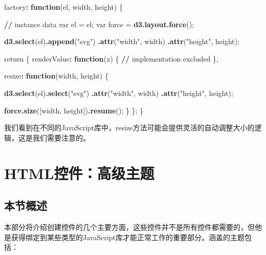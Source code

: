 \documentclass[]{book}
\newenvironment{Shaded}{\begin{snugshade}}{\end{snugshade}}
\newcommand{\KeywordTok}[1]{\textcolor[rgb]{0.13,0.29,0.53}{\textbf{#1}}}
\newcommand{\StringTok}[1]{\textcolor[rgb]{0.31,0.60,0.02}{#1}}
\newcommand{\ControlFlowTok}[1]{\textcolor[rgb]{0.13,0.29,0.53}{\textbf{#1}}}
\newcommand{\OperatorTok}[1]{\textcolor[rgb]{0.81,0.36,0.00}{\textbf{#1}}}
\newcommand{\ErrorTok}[1]{\textcolor[rgb]{0.64,0.00,0.00}{\textbf{#1}}}
\newcommand{\NormalTok}[1]{#1}
\theoremstyle{definition}
\theoremstyle{definition}
\theoremstyle{definition}
\theoremstyle{remark}
\begin{document}
\begin{Shaded}
\begin{Highlighting}[]
\NormalTok{factory}\OperatorTok{:}\StringTok{ }\ControlFlowTok{function}\NormalTok{(el, width, height) \{}

  \OperatorTok{/}\ErrorTok{/}\StringTok{ }\NormalTok{instance data}
\NormalTok{  var el =}\StringTok{ }\NormalTok{el;}
\NormalTok{  var force =}\StringTok{ }\KeywordTok{d3.layout.force}\NormalTok{();}

  \KeywordTok{d3.select}\NormalTok{(el)}\KeywordTok{.append}\NormalTok{(}\StringTok{"svg"}\NormalTok{)}
    \KeywordTok{.attr}\NormalTok{(}\StringTok{"width"}\NormalTok{, width)}
    \KeywordTok{.attr}\NormalTok{(}\StringTok{"height"}\NormalTok{, height);}
      
\NormalTok{  return \{}
\NormalTok{    renderValue}\OperatorTok{:}\StringTok{ }\ControlFlowTok{function}\NormalTok{(x) \{}
      \OperatorTok{/}\ErrorTok{/}\StringTok{ }\NormalTok{implementation excluded}
\NormalTok{    \},}
      
\NormalTok{    resize}\OperatorTok{:}\StringTok{ }\ControlFlowTok{function}\NormalTok{(width, height) \{}
         
      \KeywordTok{d3.select}\NormalTok{(el)}\KeywordTok{.select}\NormalTok{(}\StringTok{"svg"}\NormalTok{)}
        \KeywordTok{.attr}\NormalTok{(}\StringTok{"width"}\NormalTok{, width)}
        \KeywordTok{.attr}\NormalTok{(}\StringTok{"height"}\NormalTok{, height);}

      \KeywordTok{force.size}\NormalTok{([width, height])}\KeywordTok{.resume}\NormalTok{();}
\NormalTok{    \}}
\NormalTok{  \};}
\NormalTok{\}}
\end{Highlighting}
\end{Shaded}

我们看到在不同的JavaScript库中，resize方法可能会提供灵活的自动调整大小的逻辑，这是我们需要注意的。

\chapter{HTML控件：高级主题}\label{htmlwidgets-advanced}

\section{本节概述}

本部分将介绍创建控件的几个主要方面，这些控件并不是所有控件都需要的，但他是获得绑定到某些类型的JavaScript库才能正常工作的重要部分。涵盖的主题包括：
\end{document}
